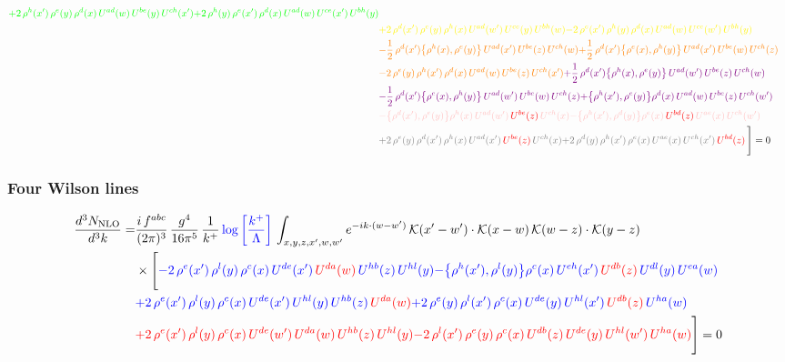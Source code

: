 \documentclass[9pt]{article}
\numberwithin{equation}{section}
\begin{document}
\begin{align}
{\color{green}+2\,\rho^{h}(x')\,\rho^{e}(y)\,\rho^{d}(x)\,U^{ad}(w)\,U^{be}(y)\,U^{ch}(x')}{\color{green}+2\,\rho^{h}(y)\,\rho^{e}(x')\,\rho^{d}(x)\,U^{ad}(w)\,U^{ce}(x')\,U^{bh}(y)}\notag \\ & {\color{yellow}+2\,\rho^{d}(x')\,\rho^{e}(y)\,\rho^{h}(x)\,U^{ad}(w')\,U^{ce}(y)\,U^{bh}(w)}{\color{yellow}-2\,\rho^{e}(x')\,\rho^{h}(y)\,\rho^{d}(x)\,U^{ad}(w)\,U^{ce}(w')\,U^{bh}(y)}\notag \\ & {\color{orange}-\frac{1}{2}\,\rho^{d}(x')\big\{\rho^{h}(x),\rho^{e}(y)\big\}\,U^{ad}(x')\,U^{be}(z)\,U^{ch}(w)}{\color{orange}+\frac{1}{2}\,\rho^{d}(x')\big\{\rho^{e}(x),\rho^{h}(y)\big\}\,U^{ad}(x')\,U^{be}(w)\,U^{ch}(z)}\notag \\
&{\color{orange}-2\,\rho^{e}(y)\,\rho^{h}(x')\,\rho^{d}(x)\,U^{ad}(w)\,U^{be}(z)\,U^{ch}(x')}{\color{violet}+\frac{1}{2}\,\rho^{d}(x')\big\{\rho^{h}(x),\rho^{e}(y)\big\}\,U^{ad}(w')\,U^{be}(z)\,U^{ch}(w)}\notag \\ & {\color{violet}-\frac{1}{2}\,\rho^{d}(x')\big\{\rho^{e}(x),\rho^{h}(y)\big\}\,U^{ad}(w')\,U^{be}(w)\,U^{ch}(z)}{\color{violet}+\big\{\rho^{h}(x'),\rho^{e}(y)\big\}\rho^{d}(x)\,U^{ad}(w)\,U^{be}(z)\,U^{ch}(w')}\notag \\ &{\color{pink}-\big\{\rho^{d}(x'),\rho^{e}(y)\big\}\rho^{h}(x)\,U^{ad}(w')\,{\color{red}U^{be}(z)}\,U^{ch}(x)}{\color{pink}-\big\{\rho^{h}(x'),\rho^{d}(y)\big\}\rho^{e}(x)\,{\color{red}U^{bd}(z)}\,U^{ae}(x)\,U^{ch}(w')}\notag \\ &{\color{gray}+2\,\rho^{e}(y)\,\rho^{d}(x')\, \rho^{h}(x)\, U^{ad}(x')\,{\color{red}U^{be}(z)}\,U^{ch}(x)}{\color{gray}+2\,\rho^{d}(y)\,\rho^{h}(x')\,\rho^{e}(x)\,U^{ae}(x)\,U^{ch}(x')\,{\color{red}U^{bd}(z)}}\,\Bigg] = 0
\end{align}    
\subsubsection{Four Wilson lines}
\begin{align}
    \frac{d^{3}N_{\rm NLO}}{d^{3}k}= & \frac{i\,f^{abc}}{(2\pi)^{3}}\,\frac{g^{4}}{16\pi^{5}}\,\frac{1}{k^{+}}\,{\color{blue}\log{\left[\frac{k^{+}}{\Lambda}\right]}}\,\int_{x,y,z,x',w,w'}e^{-ik\cdot (w-w')}\,\mathcal{K}(x'-w')\cdot\mathcal{K}(x-w)\,\mathcal{K}(w-z)\cdot\mathcal{K}(y-z)\notag \\ & \times\Bigg[{\color{blue}-2\,\rho^{e}(x')\,\rho^{l}(y)\,\rho^{c}(x)\, U^{de}(x')\,{\color{red}U^{da}(w)}\,U^{hb}(z)\,U^{hl}(y)}{\color{blue}-\big\{\rho^{h}(x'),\rho^{l}(y)\big\}\rho^{c}(x)\,U^{eh}(x')\,{\color{red}U^{db}(z)}\,U^{dl}(y)\,U^{ea}(w)}\notag \\ & {\color{blue}+2\,\rho^{e}(x')\,\rho^{l}(y)\, \rho^{c}(x)\, U^{de}(x')\,U^{hl}(y)\,U^{hb}(z)\,{\color{red}U^{da}(w)}} {\color{blue}+2\,\rho^{e}(y)\,\rho^{l}(x')\, \rho^{c}(x)\, U^{de}(y)\,U^{hl}(x')\,{\color{red}U^{db}(z)}\,U^{ha}(w)}\notag \\ & {\color{red}+2\,\rho^{e}(x')\,\rho^{l}(y)\,\rho^{c}(x)\, U^{de}(w')\,{\color{red}U^{da}(w)}\,U^{hb}(z)\,U^{hl}(y)}{\color{red}-2\,\rho^{l}(x')\,\rho^{e}(y)\, \rho^{c}(x)\, {\color{red}U^{db}(z)}\,U^{de}(y)\,U^{hl}(w')\,{\color{red}U^{ha}(w)}}\Bigg] = 0
\end{align}    
\end{document}
